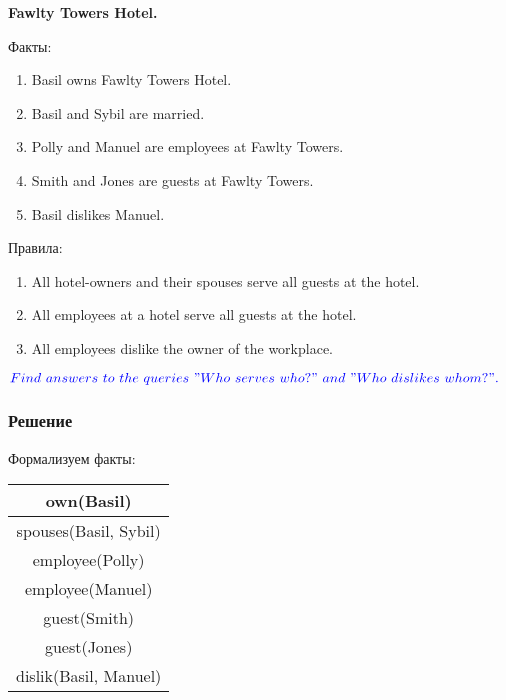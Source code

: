 \documentclass[a4paper,titlepage,oneside]{article}
\begin{document}
\begin{center}
    \textbf{ Fawlty Towers Hotel.}
\end{center} 

Факты:
\begin{enumerate}
\item Basil owns Fawlty Towers Hotel.
\item Basil and Sybil are married.
\item Polly and Manuel are employees at Fawlty Towers.
\item Smith and Jones are guests at Fawlty Towers.
\item Basil dislikes Manuel.
\end{enumerate}

Правила:
\begin{enumerate}
\item All hotel-owners and their spouses serve all guests at the hotel.
\item All employees at a hotel serve all guests at the hotel.
\item All employees dislike the owner of the workplace.
\end{enumerate}

$\textcolor{blue}{Find\ answers\ to\ the\ queries\ "Who\ serves\ who?"\ and\ "Who\ dislikes\ whom?".}$

\subsubsection*{Решение}
Формализуем факты: 
	\begin{center}
		\footnotesize 
		\begin{tabular}{|c|}
		    \hline own(Basil) \\
    	    \hline spouses(Basil, Sybil) \\ 
    	    \hline employee(Polly) \\
    	    \hline employee(Manuel) \\
    	    \hline guest(Smith) \\
  			\hline guest(Jones) \\
    		\hline dislik(Basil, Manuel) \\
			\hline
		\end{tabular}
		\normalsize
	\end{center}
\end{document}
